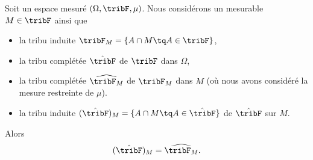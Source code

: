 \begin{proposition} \label{PROPooAMIEooRomnMG}
    Soit un espace mesuré \( (\Omega,\tribF,\mu)\). Nous considérons un mesurable \( M\in \tribF\) ainsi que
    \begin{itemize}
        \item
            la tribu induite \( \tribF_M=\{ A\cap M\tq A\in \tribF \}\),
        \item
            la tribu complétée \( \hat\tribF\) de \( \tribF\) dans \( \Omega\),
        \item
            la tribu complétée \( \widehat{\tribF_M}\) de \( \tribF_M\) dans \( M\) (où nous avons considéré la mesure restreinte de \( \mu\)).
        \item
            la tribu induite \( (\hat\tribF)_M=\{ A\cap M\tq A\in \hat\tribF \}\) de \( \hat\tribF\) sur \( M\).
    \end{itemize}
    Alors
    \begin{equation}
        (\hat\tribF)_M=\widehat{\tribF_M}.
    \end{equation}
\end{proposition}

